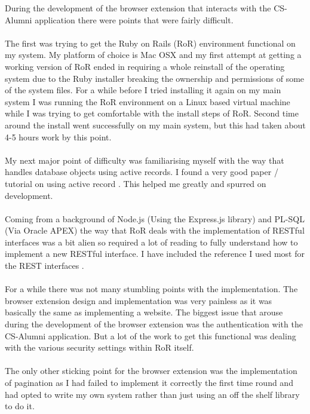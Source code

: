 \documentclass{article}
\begin{document}
During the development of the browser extension that interacts with the CS-Alumni application there were points that were fairly difficult.\\
\\
The first was trying to get the Ruby on Rails (RoR) environment functional on my system. My platform of choice is Mac OSX and my first attempt at getting a working version of RoR ended in requiring a whole reinstall of the operating system due to the Ruby installer breaking the ownership and permissions of some of the system files. For a while before I tried installing it again on my main system I was running the RoR environment on a Linux based virtual machine while I was trying to get comfortable with the install steps of RoR. Second time around the install went successfully on my main system, but this had taken about 4-5 hours work by this point.\\
\\
My next major point of difficulty was familiarising myself with the way that handles database objects using active records. I found a very good paper / tutorial on using active record \cite[see reference][page \pageref{LastPage}]{saa:2013:online}. This helped me greatly and spurred on development.\\
\\
Coming from a background of Node.js (Using the Express.js library) and PL-SQL (Via Oracle APEX) the way that RoR deals with the implementation of RESTful interfaces was a bit alien so required a lot of reading to fully understand how to implement a new RESTful interface. I have included the reference I used most for the REST interfaces \cite[see reference][page \pageref{LastPage}]{bara:2013:online}.\\
\\
For a while there was not many stumbling points with the implementation. The browser extension design and implementation was very painless as it was basically the same as implementing a website. The biggest issue that arouse during the development of the browser extension was the authentication with the CS-Alumni application. But a lot of the work to get this functional was dealing with the various security settings within RoR itself.\\
\\
The only other sticking point for the browser extension was the implementation of pagination as I had failed to implement it correctly the first time round and had opted to write my own system rather than just using an off the shelf library to do it.\\
\end{document}
